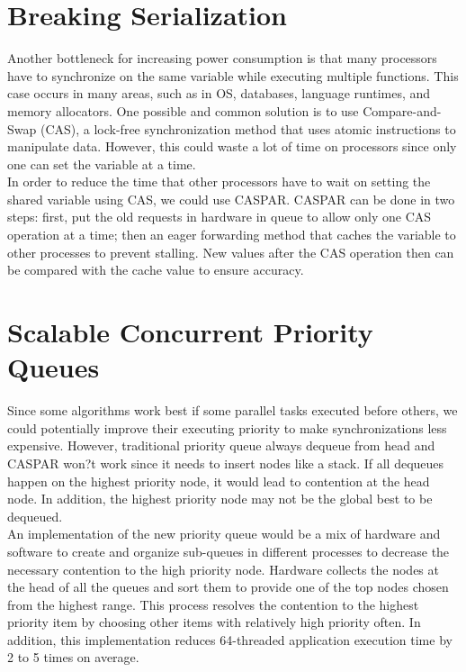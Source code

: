 \documentclass[twoside]{article}
\begin{document}
\section{Breaking Serialization}
Another bottleneck for increasing power consumption is that many processors have to synchronize on the same variable while executing multiple functions. This case occurs in many areas, such as in OS, databases, language runtimes, and memory allocators. One possible and common solution is to use Compare-and-Swap (CAS), a lock-free synchronization method that uses atomic instructions to manipulate data. However, this could waste a lot of time on processors since only one can set the variable at a time. \\

In order to reduce the time that other processors have to wait on setting the shared variable using CAS, we could use CASPAR. CASPAR can be done in two steps: first, put the old requests in hardware in queue to allow only one CAS operation at a time; then an eager forwarding method that caches the variable to other processes to prevent stalling. New values after the CAS operation then can be compared with the cache value to ensure accuracy. 


\section{Scalable Concurrent Priority Queues}
Since some algorithms work best if some parallel tasks executed before others, we could potentially improve their executing priority to make synchronizations less expensive. However, traditional priority queue always dequeue from head and CASPAR won?t work since it needs to insert nodes like a stack. If all dequeues happen on the highest priority node, it would lead to contention at the head node. In addition, the highest priority node may not be the global best to be dequeued. \\

An implementation of the new priority queue would be a mix of hardware and software to create and organize sub-queues in different processes to decrease the necessary contention to the high priority node. Hardware collects the nodes at the head of all the queues and sort them to provide one of the top nodes chosen from the highest range. This process resolves the contention to the highest priority item by choosing other items with relatively high priority often. In addition, this implementation reduces 64-threaded application execution time by 2 to 5 times on average.
\end{document}
